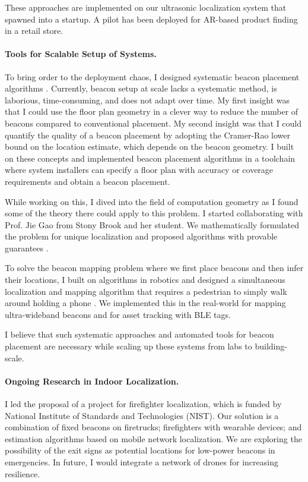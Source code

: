 \documentclass[10pt]{article}
\begin{document}
These approaches are implemented on our ultrasonic localization system that spawned into a startup. A pilot has been deployed for AR-based product finding in a retail store. 

\paragraph{Tools for Scalable Setup of Systems.  }

To bring order to the deployment chaos, I designed systematic beacon placement algorithms \cite{rajagopal2016beacon}. Currently, beacon setup at scale lacks a systematic method, is laborious, time-consuming, and does not adapt over time. 
My first insight was that I could use the floor plan geometry in a clever way to reduce the number of beacons compared to conventional placement. 
My second insight was that I could quantify the quality of a beacon placement by adopting the Cramer-Rao lower bound on the location estimate, which depends on the beacon geometry. I built on these concepts and implemented beacon placement algorithms in a toolchain where system installers can specify a floor plan with accuracy or coverage requirements and obtain a beacon placement. 

While working on this, I dived into the field of computation geometry as I found some of the theory there could apply to this problem. 
I started collaborating with Prof. Jie Gao from Stony Brook and her student. 
We mathematically formulated the problem for unique localization and proposed algorithms with provable guarantees \cite{beaconplacementtheory}.  

To solve the beacon mapping problem where we first place beacons and then infer their locations, I built on algorithms in robotics and designed a simultaneous localization and mapping algorithm that requires a pedestrian to simply walk around holding a phone \cite{mobileAR}. We implemented this in the real-world for mapping ultra-wideband beacons and for asset tracking with BLE tags. 

I believe that such systematic approaches and automated tools for beacon placement are necessary while scaling up these systems from labs to building-scale.

\paragraph{Ongoing Research in Indoor Localization. }
I led the proposal of a project for firefighter localization, which is funded by National Institute of Standards and Technologies (NIST). Our solution is a combination of fixed beacons on firetrucks; firefighters with wearable devices; and estimation algorithms based on mobile network localization. We are exploring the possibility of the exit signs as potential locations for low-power beacons in emergencies. 
In future, I would integrate a network of drones for increasing resilience. 
\end{document}
